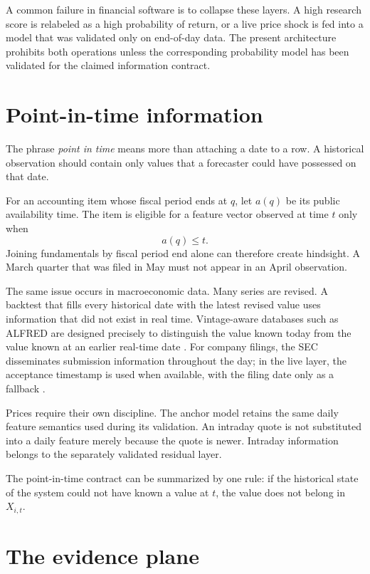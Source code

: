 \documentclass[11pt]{article}
\begin{document}
A common failure in financial software is to collapse these layers. A high research score is relabeled as a high probability of return, or a live price shock is fed into a model that was validated only on end-of-day data. The present architecture prohibits both operations unless the corresponding probability model has been validated for the claimed information contract.

\section{Point-in-time information}
\label{sec:pit}

The phrase \emph{point in time} means more than attaching a date to a row. A historical observation should contain only values that a forecaster could have possessed on that date.

For an accounting item whose fiscal period ends at $q$, let $a(q)$ be its public availability time. The item is eligible for a feature vector observed at time $t$ only when
\begin{equation}
a(q)\le t.
\label{eq:availability}
\end{equation}
Joining fundamentals by fiscal period end alone can therefore create hindsight. A March quarter that was filed in May must not appear in an April observation.

The same issue occurs in macroeconomic data. Many series are revised. A backtest that fills every historical date with the latest revised value uses information that did not exist in real time. Vintage-aware databases such as ALFRED are designed precisely to distinguish the value known today from the value known at an earlier real-time date \citep{fred_realtime}. For company filings, the SEC disseminates submission information throughout the day; in the live layer, the acceptance timestamp is used when available, with the filing date only as a fallback \citep{sec_edgar_api}.

Prices require their own discipline. The anchor model retains the same daily feature semantics used during its validation. An intraday quote is not substituted into a daily feature merely because the quote is newer. Intraday information belongs to the separately validated residual layer.

The point-in-time contract can be summarized by one rule: if the historical state of the system could not have known a value at $t$, the value does not belong in $X_{i,t}$.

\section{The evidence plane}
\label{sec:evidence}
\end{document}
